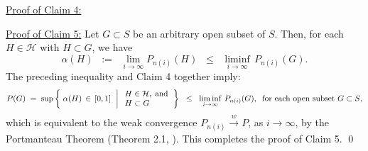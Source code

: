 \vskip 0.5cm
\noindent
\underline{Proof of Claim 4:}\quad

\vskip 0.5cm
\noindent
\underline{Proof of Claim 5:}\quad
Let $G \subset S$ be an arbitrary open subset of $S$.
Then, for each $H \in \mathcal{H}$ with $H \subset G$, we have
\begin{equation*}
\alpha(H)
\;\; := \;\; \lim_{i\rightarrow\infty}P_{n(i)}(H)
\;\; \leq \;\; \liminf_{i\rightarrow\infty}\,P_{n(i)}(G).
\end{equation*}
The preceding inequality and Claim 4 together imply:
\begin{equation*}
P(G)
\; = \;
\sup\left\{\;
\alpha(H) \,\in\, [0,1]
\,\;\left\vert\;
\begin{array}{l} H \in \mathcal{H}, \;\textnormal{and} \\ H \subset G \end{array}
\right.
\right\}
\;\;\leq\;\;
\liminf_{i\rightarrow\infty}\,P_{n(i)}(G),
\;\;
\textnormal{for each open subset $G \subset S$},
\end{equation*}
which is equivalent to the weak convergence
$P_{n(i)} \overset{w}{\longrightarrow} P$, as $i \longrightarrow \infty$,
by the Portmanteau Theorem (Theorem 2.1, \cite{Billingsley1999}).
This completes the proof of Claim 5.
\qed
